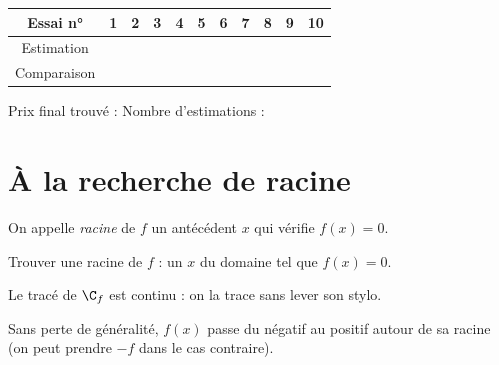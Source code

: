 \hspace{-40pt}
\begin{tabular}{|*{11}{c|}}\hline
	Essai n° & 1 & 2 & 3 & 4 & 5 & 6 & 7 & 8 & 9 & 10 
	\\\hline
	Estimation & & & & & & & & & &
	\\\hline
	Comparaison & & & & & & & & & &
	\\\hline
\end{tabular}

\vspace{10pt}
Prix final trouvé :
\hspace{6cm}
Nombre d'estimations :

%	
%
%
%	

\section*{À la recherche de racine}

\begin{namedtheorem}[Nomenclature]
	On appelle \emph{racine} de $f$ un antécédent $x$ qui vérifie $f(x) = 0$.
\end{namedtheorem}

\begin{namedtheorem}[But]
	Trouver une racine de $f$ : un $x$ du domaine tel que $f(x) = 0$.
\end{namedtheorem}

\begin{namedtheorem}[Hypothèses]
	Le tracé de $\C_f$ est continu : on la trace sans lever son stylo.
	
	Sans perte de généralité, $f(x)$ passe du négatif au positif autour de sa racine (on peut prendre $-f$ dans le cas contraire).
\end{namedtheorem}


